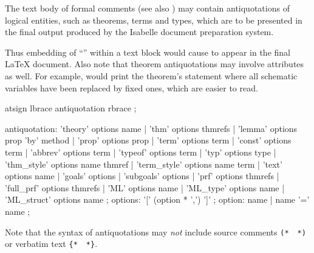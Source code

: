 \begin{isabellebody}
\begin{isamarkuptext}
  The text body of formal comments (see also )
  may contain antiquotations of logical entities, such as theorems,
  terms and types, which are to be presented in the final output
  produced by the Isabelle document preparation system.

  Thus embedding of ``''
  within a text block would cause
   to appear in the final {\LaTeX} document.  Also note that theorem
  antiquotations may involve attributes as well.  For example,
   would print the theorem's
  statement where all schematic variables have been replaced by fixed
  ones, which are easier to read.

  \begin{rail}
    atsign lbrace antiquotation rbrace
    ;

    antiquotation:
      'theory' options name |
      'thm' options thmrefs |
      'lemma' options prop 'by' method |
      'prop' options prop |
      'term' options term |
      'const' options term |
      'abbrev' options term |
      'typeof' options term |
      'typ' options type |
      'thm\_style' options name thmref |
      'term\_style' options name term |
      'text' options name |
      'goals' options |
      'subgoals' options |
      'prf' options thmrefs |
      'full\_prf' options thmrefs |
      'ML' options name |
      'ML\_type' options name |
      'ML\_struct' options name
    ;
    options: '[' (option * ',') ']'
    ;
    option: name | name '=' name
    ;
  \end{rail}

  Note that the syntax of antiquotations may \emph{not} include source
  comments \verb|(*|~\isa{{\isachardoublequote}{\isasymdots}{\isachardoublequote}}~\verb|*)| or verbatim
  text \verb|{|\verb|*|~\isa{{\isachardoublequote}{\isasymdots}{\isachardoublequote}}~\verb|*|\verb|}|.


\end{isamarkuptext}
\end{isabellebody}
